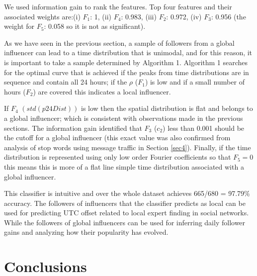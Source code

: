 We used information gain to rank the features.  Top four features and their associated weights are:(i) $F_1$: 1, (ii) $F_4$: 0.983, (iii) $F_2$: 0.972, (iv) $F_3$: 0.956 (the weight for $F_5$: 0.058 so it is not as significant).

 As we have seen in the previous section, a sample of followers from a global influencer can lead to a time distribution that is unimodal, and for this reason, it is important to take a sample determined by Algorithm 1. Algorithm 1 searches for the optimal curve that is achieved if the peaks from time distributions are in sequence and contain all 24 hours; if the $\rho$ ($F_1$) is low and if a small number of hours ($F_2$) are covered this indicates a local influencer. 

If $F_4$ $(std(p24Dist))$ is low then the spatial  distribution is flat and belongs to a global influencer; which is consistent with observations made in the previous sections. The information gain identified that $F_3$ ($c_2$) less than 0.001 should be the cutoff for a global influencer (this exact value was also confirmed from analysis of stop words using message traffic in Section \ref{sec4}). Finally, if the time distribution is represented using only low order Fourier coefficients so that $F_5=0$ this means this is more of a flat line simple time distribution associated with a global influencer. %

This classifier is intuitive and over the whole dataset achieves 665/680 = 97.79\% accuracy. The followers of influencers that the classifier predicts as local %
can be used for predicting UTC offset related to local expert finding in social networks. While the followers of global influencers %
can be used for inferring daily follower gains and analyzing how their popularity has evolved.

\section{Conclusions} \label{sec7}

